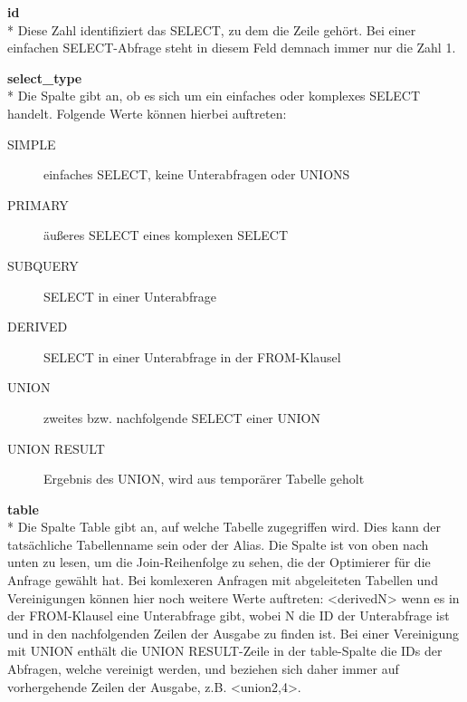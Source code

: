 \textbf{id}\\*
Diese Zahl identifiziert das SELECT, zu dem die Zeile gehört. Bei einer einfachen SELECT-Abfrage steht in diesem Feld demnach immer nur die Zahl 1.

\textbf{select\_type}\\*
Die Spalte gibt an, ob es sich um ein einfaches oder komplexes SELECT handelt. Folgende Werte können hierbei auftreten:
\begin{description}
	\item[SIMPLE] einfaches SELECT, keine Unterabfragen oder UNIONS
	\item[PRIMARY] äußeres SELECT eines komplexen SELECT
	\item[SUBQUERY] SELECT in einer Unterabfrage
	\item[DERIVED] SELECT in einer Unterabfrage in der FROM-Klausel
	\item[UNION] zweites bzw. nachfolgende SELECT einer UNION
	\item[UNION RESULT] Ergebnis des UNION, wird aus temporärer Tabelle geholt
\end{description}

\textbf{table}\\*
Die Spalte Table gibt an, auf welche Tabelle zugegriffen wird. Dies kann der tatsächliche Tabellenname sein oder der Alias. Die Spalte ist von oben nach unten zu lesen, um die Join-Reihenfolge zu sehen, die der Optimierer für die Anfrage gewählt hat.
Bei komlexeren Anfragen mit abgeleiteten Tabellen und Vereinigungen können hier noch weitere Werte auftreten: <derivedN> wenn es in der FROM-Klausel eine Unterabfrage gibt, wobei N die ID der Unterabfrage ist und in den nachfolgenden Zeilen der Ausgabe zu finden ist. Bei einer Vereinigung mit UNION enthält die UNION RESULT-Zeile in der table-Spalte die IDs der Abfragen, welche vereinigt werden, und beziehen sich daher immer auf vorhergehende Zeilen der Ausgabe, z.B. <union2,4>.

